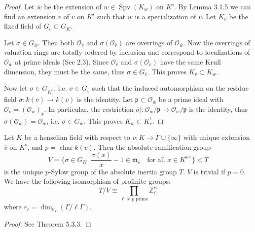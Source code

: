 \begin{proof}
Let $\overline{w}$ be the extension of $w\in\operatorname{Spv}(K_w)$ on $K^\text{s}$. By \cite{EP05} Lemma 3.1.5 we can find an extension $\overline{v}$ of $v$ on $K^\text{s}$ such that $\overline{w}$ is a specialization of $\overline{v}$. Let $K_v$ be the fixed field of $G_{\overline{v}}\subset G_K$.

Let $\sigma\in G_{\overline{w}}$. Then both $\mathcal{O}_{\overline{v}}$ and $\sigma(\mathcal{O}_{\overline{v}})$ are overrings of $\mathcal{O}_{\overline{w}}$. Now the overrings of valuation rings are totally ordered by inclusion and correspond to localizations of $\mathcal{O}_{\overline{w}}$ at prime ideals (See \cite{EP05} 2.3). Since $\mathcal{O}_{\overline{v}}$ and $\sigma(\mathcal{O}_{\overline{v}})$ have the same Krull dimension, they must be the same, thus $\sigma\in G_{\overline{v}}$. This proves $K_v\subset K_w$.

Now let $\sigma\in G_{K_v^\text{t}}$, i.e. $\sigma\in G_{\overline{v}}$ such that the induced automorphism on the residue field $\overline{\sigma}:k(\overline{v})\to k(\overline{v})$ is the identity. Let $\mathfrak{p}\subset\mathcal{O}_{\overline{w}}$ be a prime ideal with $\mathcal{O}_{\overline{v}} = (\mathcal{O}_{\overline{w}})_\mathfrak{p}$. In particular, the restriction $\overline{\sigma}|: \mathcal{O}_{\overline{w}}/\mathfrak{p}\to \mathcal{O}_{\overline{w}}/\mathfrak{p}$ is the identity, thus $\sigma(\mathcal{O}_{\overline{w}})=\mathcal{O}_{\overline{w}}$, i.e. $\sigma\in G_{\overline{w}}$. This proves $K_w\subset K_v^\text{t}$.
\end{proof}

\begin{theorem}\label{theorem-sylowgroups-inertiagroup}
Let $K$ be a henselian field with respect to $v:K\to\Gamma\cup\{\infty\}$ with unique extension $\overline{v}$ on $K^\text{s}$, and $p=\operatorname{char}k(v)$. Then the absolute ramification group
\[ V = \Big\{ \sigma\in G_K\mathop{\Big|} \frac{\sigma(x)}{x}-1\in\mathfrak{m}_{\overline{v}}\quad \text{for all }x\in {K^\text{s}}^\times \Big\} \lhd T \]
is the unique $p$-Sylow group of the absolute inertia group $T$. $V$ is trivial if $p=0$. We have the following isomorphism of profinite groups:
\[ T/V \cong \prod_{\ell\neq p\text{ prime}}\mathbb{Z}_\ell^{r_\ell} \]
where $r_\ell = \dim_{\mathbb{F}_\ell}(\Gamma/\ell\Gamma)$.
\end{theorem}

\begin{proof}
See \cite{EP05} Theorem 5.3.3.
\end{proof}

